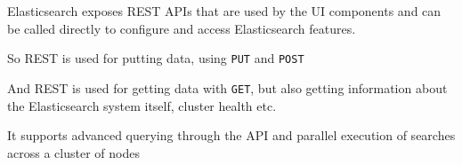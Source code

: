 \documentclass[Screen16to9,17pt]{foils}
\begin{document}
\begin{list2}
\item Elasticsearch exposes REST APIs that are used by the UI components and can be called directly to configure and access Elasticsearch features.
\item {}
\item So REST is used for putting data, using \verb+PUT+ and \verb+POST+
\item And REST is used for getting data with \verb+GET+, but also getting information about the Elasticsearch system itself, cluster health etc.
\item It supports advanced querying through the API and parallel execution of searches across a cluster of nodes
\end{list2}




\slidenext
\end{document}
